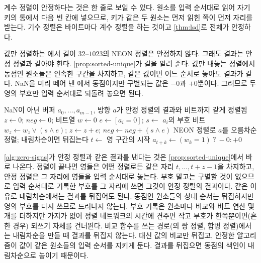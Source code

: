 계수 정렬이 안정하다는 것은 한 줄로 보일 수 있다. 원소를 입력 순서대로 읽어 자기 키의 통에서 다음 빈 칸에 넣으므로, 키가 같은 두 원소는 먼저 읽힌 쪽이 먼저 자리를 받는다. 기수 정렬은 바이트마다 계수 정렬을 하는 것이고 \cref{thm:lsd}로 전체가 안정하다.

값만 정렬하는 에서 길이 $32$--$1023$의 NEON 정렬은 안정하지 않다. 그래도 결과는 안정 정렬과 같아야 한다. \cref{prop:sorted-unique}가 길을 알려 준다. 값만 내놓는 정렬에서 동점인 원소들은 연속한 구간을 차지하고, 같은 값이면 어느 순서로 놓아도 결과가 같다. NaN을 미리 떼어 낸 에서 동점이지만 구별되는 값은 $-0$과 $+0$뿐이다. 그러므로 두 영의 부호만 입력 순서대로 되돌려 놓으면 된다.

\begin{algorithm}[htbp]
\begin{algorithmic}[1]
\Require NaN이 아닌  버퍼 $a_0,\dots,a_{m-1}$, 방향
\Ensure $a$가 안정 정렬의 결과와 비트까지 같게 정렬됨
\State $z\gets0$; $\mathit{neg}\gets0$; 비트열 $w\gets0$
 
  \State $e\gets[a_i=0]$; $s\gets$ $a_i$의 부호 비트
  \State $w_z\gets w_z\lor(s\land e)$; $z\gets z+e$; $\mathit{neg}\gets\mathit{neg}+(s\land e)$
\EndFor
\State NEON 정렬로 $a$를 오름차순 정렬; 내림차순이면 뒤집는다
 
  \State $t\gets$ 영 구간의 시작 
    \State $a_{t+k}\gets(w_k=1)\ ?\ -0:+0$
  \EndFor
\EndIf
\end{algorithmic}
\caption{안정하지 않은 정렬 뒤 영의 부호 되돌리기 (stardust )}
\label{alg:zero-signs}
\end{algorithm}

\cref{alg:zero-signs}가 안정 정렬과 같은 결과를 낸다는 것은 \cref{prop:sorted-unique}에서 바로 나온다. 정렬이 끝나면 영들은 어떤 정렬로든 같은 자리 $t,\dots,t+z-1$을 차지하고, 안정 정렬은 그 자리에 영들을 입력 순서대로 놓는다. 부호 말고는 구별할 것이 없으므로 입력 순서대로 기록한 부호를 그 자리에 쓰면 그것이 안정 정렬의 결과이다. 같은 이유로 내림차순에서는 결과를 뒤집어도 된다. 동점인 원소들의 상대 순서는 뒤집히지만 영의 부호를 다시 쓰므로 드러나지 않는다. 부호 기록은 원소마다 비교와 비트 연산 몇 개를 더하지만 가지가 없어 정렬 네트워크의 시간에 견주면 작고 부호가 한쪽뿐이면(흔한 경우) 되쓰기 자체를 건너뛴다. 비교 함수를 쓰는 경로(의 쌍 정렬, 합병 정렬)에서는 내림차순을 만들 때 결과를 뒤집지 않는다. 대신 값의 비교만 뒤집고, 안정한 알고리즘이 값이 같은 원소들의 입력 순서를 지키게 둔다. 결과를 뒤집으면 동점의 색인이 내림차순으로 놓이기 때문이다.

